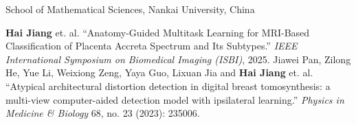 \documentclass[11pt,a4paper, final]{moderncv}
\newcommand{\spacesection}{\vspace{0.4cm}}
\begin{document}
	{}{}{School of Mathematical Sciences, Nankai University, China}
\nocite{*}

	\begin{thebibliography}{99}
		\bibitem[1]{} 
					\textbf{Hai Jiang} et. al. 
					``Anatomy-Guided Multitask Learning for MRI-Based Classification of Placenta Accreta Spectrum and Its Subtypes.'' 
					\emph{IEEE International Symposium on Biomedical Imaging (ISBI)}, 2025.
		\bibitem[2]{} 
					Jiawei Pan, Zilong He, Yue Li, Weixiong Zeng, Yaya Guo, Lixuan Jia and \textbf{Hai Jiang} et. al. 
					``Atypical architectural distortion detection in digital breast tomosynthesis: a multi-view computer-aided detection model with ipsilateral learning.'' 
					\emph{Physics in Medicine \& Biology} 68, no. 23 (2023): 235006.
	\end{thebibliography}
\end{document}

